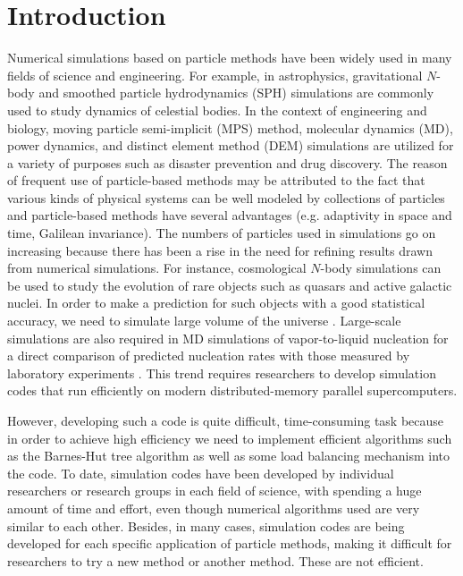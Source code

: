 \documentclass[twocolumn,useamsfonts]{pasj01}
\begin{document}
\section{Introduction}
\label{sec:introduction}
Numerical simulations based on particle methods have been widely used in many fields of science and engineering. For example, in astrophysics, gravitational $N$-body and smoothed particle hydrodynamics (SPH) simulations are commonly used to study dynamics of celestial bodies. In the context of engineering and biology, moving particle semi-implicit (MPS) method, molecular dynamics (MD), power dynamics, and distinct element method (DEM) simulations are utilized for a variety of purposes such as disaster prevention and drug discovery. The reason of frequent use of particle-based methods may be attributed to the fact that various kinds of physical systems can be well modeled by collections of particles and particle-based methods have several advantages (e.g. adaptivity in space and time, Galilean invariance). The numbers of particles used in simulations go on increasing because there has been a rise in the need for refining results drawn from numerical simulations. For instance, cosmological $N$-body simulations can be used to study the evolution of rare objects such as quasars and active galactic nuclei. In order to make a prediction for such objects with a good statistical accuracy, we need to simulate large volume of the universe \citep{ishiyama15:_the_nu2_gc_simulations}. Large-scale simulations are also required in MD simulations of vapor-to-liquid nucleation for a direct comparison of predicted nucleation rates with those measured by laboratory experiments \citep{diemand13:_large_scale_molecular}. This trend requires researchers to develop simulation codes that run efficiently on modern distributed-memory parallel supercomputers.

However, developing such a code is quite difficult, time-consuming task because in order to achieve high efficiency we need to implement efficient algorithms such as the Barnes-Hut tree algorithm \citep{barnes_hut86:_a_hierarchical} as well as some load balancing mechanism into the code. To date, simulation codes have been developed by individual researchers or research groups in each field of science, with spending a huge amount of time and effort, even though numerical algorithms used are very similar to each other. Besides, in many cases, simulation codes are being developed for each specific application of particle methods, making it difficult for researchers to try a new method or another method. These are not efficient. 
\end{document}
